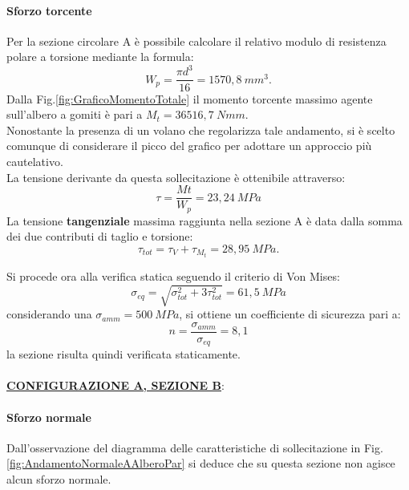 \paragraph{Sforzo torcente}Per la sezione circolare A è possibile calcolare il relativo modulo di resistenza polare a torsione mediante la formula:
\begin{equation}
    W_p=\frac{\pi d^3}{16}=1570,8\ mm^3.
\end{equation}
Dalla Fig.\ref{fig:GraficoMomentoTotale} il momento torcente massimo agente sull'albero a gomiti è pari a $M_t=36516,7\ Nmm$. \\
Nonostante la presenza di un volano che regolarizza tale andamento, si è scelto comunque di considerare il picco del grafico per adottare un approccio più cautelativo.\\
La tensione derivante da questa sollecitazione è ottenibile attraverso:
\begin{equation}
    \tau=\frac{Mt}{W_p}=23,24\ MPa
    \label{tauATorcente}
\end{equation}
 La tensione \textbf{tangenziale} massima raggiunta nella sezione A è data dalla somma dei due contributi di taglio e torsione:
\begin{equation}
    \tau_{tot}=\tau_{V}+\tau_{M_t}=28,95\ MPa.
\end{equation}

Si procede ora alla verifica statica seguendo il criterio di Von Mises:
\begin{equation}
    \sigma_{eq}=\sqrt{\sigma_{tot}^2+3\tau_{tot}^2}=61,5\ MPa
\end{equation}
considerando una $\sigma_{amm}=500\ MPa$, si ottiene un coefficiente di sicurezza pari a:
\begin{equation}
    n=\frac{\sigma_{amm}}{\sigma_{eq}}=8,1
\end{equation}
la sezione risulta quindi verificata staticamente.\\
\\
\underline{\textbf{CONFIGURAZIONE A, SEZIONE B}}:
\paragraph{Sforzo normale} Dall'osservazione del diagramma delle caratteristiche di sollecitazione in Fig.\ref{fig:AndamentoNormaleAAlberoPar} si deduce che su questa sezione non agisce alcun sforzo normale.
